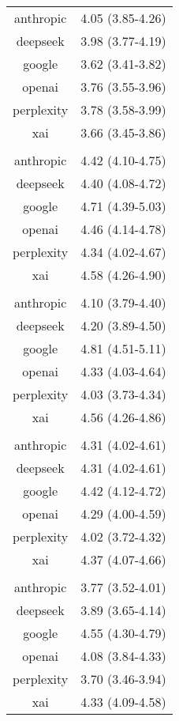 \documentclass[
  11pt]{report}
\begin{document}
\begin{longtable*}{cr}
\midrule\addlinespace[2.5pt]
 \\[2.5pt] 
\midrule\addlinespace[2.5pt]
anthropic & 4.05 (3.85-4.26) \\ 
deepseek & 3.98 (3.77-4.19) \\ 
google & 3.62 (3.41-3.82) \\ 
openai & 3.76 (3.55-3.96) \\ 
perplexity & 3.78 (3.58-3.99) \\ 
xai & 3.66 (3.45-3.86) \\ 
\midrule\addlinespace[2.5pt]
 \\[2.5pt] 
\midrule\addlinespace[2.5pt]
anthropic & 4.42 (4.10-4.75) \\ 
deepseek & 4.40 (4.08-4.72) \\ 
google & 4.71 (4.39-5.03) \\ 
openai & 4.46 (4.14-4.78) \\ 
perplexity & 4.34 (4.02-4.67) \\ 
xai & 4.58 (4.26-4.90) \\ 
\midrule\addlinespace[2.5pt]
 \\[2.5pt] 
\midrule\addlinespace[2.5pt]
anthropic & 4.10 (3.79-4.40) \\ 
deepseek & 4.20 (3.89-4.50) \\ 
google & 4.81 (4.51-5.11) \\ 
openai & 4.33 (4.03-4.64) \\ 
perplexity & 4.03 (3.73-4.34) \\ 
xai & 4.56 (4.26-4.86) \\ 
\midrule\addlinespace[2.5pt]
 \\[2.5pt] 
\midrule\addlinespace[2.5pt]
anthropic & 4.31 (4.02-4.61) \\ 
deepseek & 4.31 (4.02-4.61) \\ 
google & 4.42 (4.12-4.72) \\ 
openai & 4.29 (4.00-4.59) \\ 
perplexity & 4.02 (3.72-4.32) \\ 
xai & 4.37 (4.07-4.66) \\ 
\midrule\addlinespace[2.5pt]
 \\[2.5pt] 
\midrule\addlinespace[2.5pt]
anthropic & 3.77 (3.52-4.01) \\ 
deepseek & 3.89 (3.65-4.14) \\ 
google & 4.55 (4.30-4.79) \\ 
openai & 4.08 (3.84-4.33) \\ 
perplexity & 3.70 (3.46-3.94) \\ 
xai & 4.33 (4.09-4.58) \\ 
\bottomrule
\end{longtable*}
\endgroup
\end{document}
